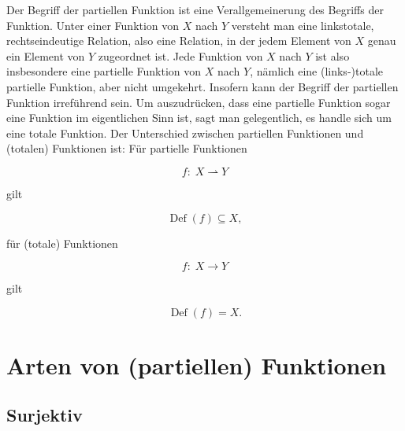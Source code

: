 \documentclass{lehramt-informatik-haupt}
\begin{document}
Der Begriff der partiellen Funktion ist eine Verallgemeinerung des
Begriffs der Funktion. Unter einer Funktion von $X$ nach $Y$ versteht
man eine linkstotale, rechtseindeutige Relation, also eine Relation, in
der jedem Element von $X$ genau ein Element von $Y$ zugeordnet ist. Jede
Funktion von $X$ nach $Y$ ist also insbesondere eine partielle Funktion
von $X$ nach $Y$, nämlich eine (links-)totale partielle Funktion, aber
nicht umgekehrt. Insofern kann der Begriff der partiellen Funktion
irreführend sein. Um auszudrücken, dass eine partielle Funktion sogar
eine Funktion im eigentlichen Sinn ist, sagt man gelegentlich, es handle
sich um eine totale Funktion. Der Unterschied zwischen partiellen
Funktionen und (totalen) Funktionen ist: Für partielle Funktionen

\begin{displaymath}
f\colon \;X \rightharpoonup Y
\end{displaymath}

\noindent
gilt

\begin{displaymath}
\operatorname {Def} (f) \subseteq X ,
\end{displaymath}

\noindent
für (totale) Funktionen

\begin{displaymath}
f \colon \; X \to Y
\end{displaymath}

 gilt

\begin{displaymath}
\operatorname {Def} (f)=X .
\end{displaymath}



\section{Arten von (partiellen) Funktionen}

%

\subsection{Surjektiv}
\end{document}
